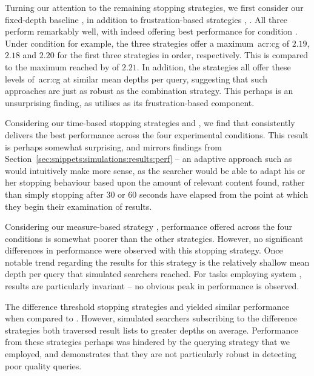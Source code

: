Turning our attention to the remaining stopping strategies, we first consider our fixed-depth baseline , in addition to frustration-based strategies , . All three perform remarkably well, with  indeed offering best performance for condition . Under condition  for example, the three strategies offer a maximum~\gls{acr:cg} of $2.19$, $2.18$ and $2.20$ for the first three strategies in order, respectively. This is compared to the maximum reached by  of $2.21$. In addition, the strategies all offer these levels of~\gls{acr:cg} at similar mean depths per query, suggesting that such approaches are just as robust as the combination strategy. This perhaps is an unsurprising finding, as  utilises  as its frustration-based component.

Considering our time-based stopping strategies  and , we find that  consistently delivers the best performance across the four experimental conditions. This result is perhaps somewhat surprising, and mirrors findings from Section~\ref{sec:snippets:simulations:results:perf} -- an adaptive approach such as  would intuitively make more sense, as the searcher would be able to adapt his or her stopping behaviour based upon the amount of relevant content found, rather than simply stopping after $30$ or $60$ seconds have elapsed from the point at which they begin their examination of results.

Considering our measure-based strategy , performance offered across the four conditions is somewhat poorer than the other strategies. However, no significant differences in performance were observed with this stopping strategy. Once notable trend regarding the results for this strategy is the relatively shallow mean depth per query that simulated searchers reached. For tasks employing system , results are particularly invariant -- no obvious peak in performance is observed.

The difference threshold stopping strategies  and  yielded similar performance when compared to . However, simulated searchers subscribing to the difference strategies both traversed result lists to greater depths on average. Performance from these strategies perhaps was hindered by the querying strategy that we employed, and demonstrates that they are not particularly robust in detecting poor quality queries.

